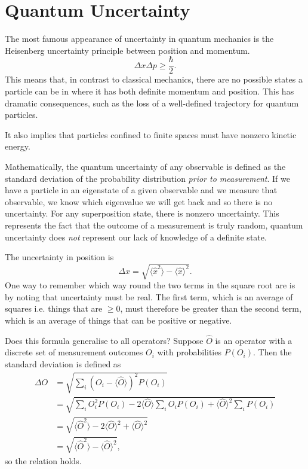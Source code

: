 \documentclass[../quantum_mechanics.tex]{subfiles}
\begin{document}
    \section{Quantum Uncertainty}\label{sec:quantum-uncertainty}
        The most famous appearance of uncertainty in quantum mechanics is the Heisenberg uncertainty principle between position and momentum.
        \begin{equation}\label{eq:x-p-uncertainty}
            \Delta x\Delta p\geq\frac{\hbar}{2}.
        \end{equation}
        This means that, in contrast to classical mechanics, there are no possible states a particle can be in where it has both definite momentum and position.
        This has dramatic consequences, such as the loss of a well-defined trajectory for quantum particles.

        It also implies that particles confined to finite spaces must have nonzero kinetic energy.

        Mathematically, the quantum uncertainty of any observable is defined as the standard deviation of the probability distribution \textit{prior to measurement}.
        If we have a particle in an eigenstate of a given observable and we measure that observable, we know which eigenvalue we will get back and so there is no uncertainty.
        For any superposition state, there is nonzero uncertainty.
        This represents the fact that the outcome of a measurement is truly random, quantum uncertainty does \textit{not} represent our lack of knowledge of a definite state.

        The uncertainty in position is
        \begin{equation}
            \Delta x=\sqrt{\langle\hat{x}^2\rangle-\langle\hat{x}\rangle^2}.
        \end{equation}
        One way to remember which way round the two terms in the square root are is by noting that uncertainty must be real.
        The first term, which is an average of squares i.e. things that are $\geq 0$, must therefore be greater than the second term, which is an average of things that can be positive or negative.

        Does this formula generalise to all operators?
        Suppose $\hat{O}$ is an operator with a discrete set of measurement outcomes $O_i$ with probabilities $P(O_i)$.
        Then the standard deviation is defined as
        \begin{align}
            \Delta O&=\sqrt{\sum_i (O_i-\langle\hat{O}\rangle)^2P(O_i)}\\
            &=\sqrt{\sum_i O_i^2P(O_i)-2\langle\hat{O}\rangle\sum_i O_iP(O_i)+\langle\hat{O}\rangle^2\sum_i P(O_i)}\\
            &=\sqrt{\langle\hat{O}^2\rangle-2\langle\hat{O}\rangle^2+\langle\hat{O}\rangle^2}\\
            &=\sqrt{\langle\hat{O}^2\rangle-\langle\hat{O}\rangle^2},
        \end{align}
        so the relation holds.
\end{document}

